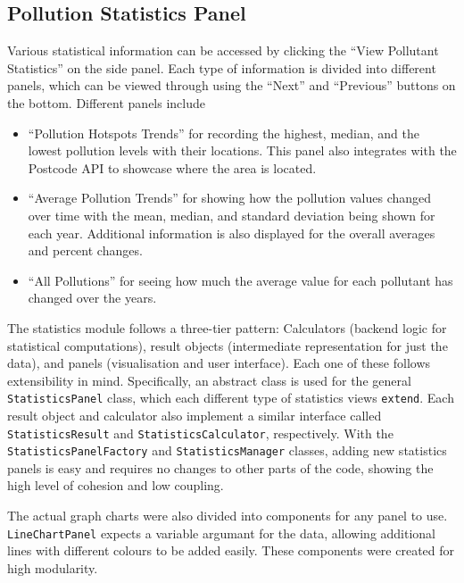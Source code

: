 \documentclass[10pt, a4paper]{scrartcl}
\begin{document}
\begin{multicols}{2}
\subsection{Pollution Statistics Panel}

\noindent Various statistical information can be accessed by clicking the “View Pollutant Statistics” on the side panel.
Each type of information is divided into different panels, which can be viewed through using the “Next” and “Previous”
buttons on the bottom. Different panels include

\vspace{-0.2em}

\begin{itemize}
    \itemsep-0.3em
    \item “Pollution Hotspots Trends” for recording the highest, median, and the lowest pollution levels with their locations.
    This panel also integrates with the Postcode API to showcase where the area is located.
    
    \item“Average Pollution Trends” for showing how the pollution values changed over time with the mean, median, and
    standard deviation being shown for each year. Additional information is also displayed for the overall averages and
    percent changes.
    
    \item “All Pollutions” for seeing how much the average value for each pollutant has changed over the years.
\end{itemize}

\vspace{-0.2em}
    
\noindent The statistics module follows a three-tier pattern: Calculators (backend logic for statistical computations),
result objects (intermediate representation for just the data), and panels (visualisation and user interface). Each one
of these follows extensibility in mind. Specifically, an abstract class is used for the general \verb|StatisticsPanel|
class, which each different type of statistics views \verb|extend|. Each result object and calculator also implement a
similar interface called \verb|StatisticsResult| and \verb|StatisticsCalculator|, respectively. With the
\verb|StatisticsPanelFactory| and \verb|StatisticsManager| classes, adding new statistics panels is easy and requires no
changes to other parts of the code, showing the high level of cohesion and low coupling.
    
\noindent The actual graph charts were also divided into components for any panel to use. \verb|LineChartPanel| expects a
variable argumant for the data, allowing additional lines with different colours to be added easily. These components were
created for high modularity.
    

\end{multicols}
\end{document}

